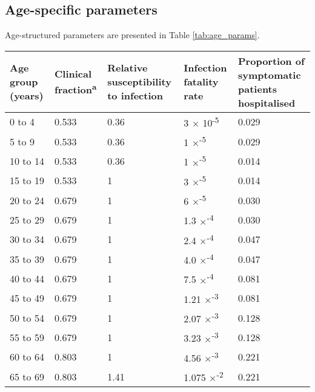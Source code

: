 \subsection{Age-specific parameters}

Age-structured parameters are presented in Table \ref{tab:age_params}.

\begin{table}[ht]
\renewcommand{\baselinestretch}{1}
    \begin{tabular}[ht]{| p{2cm} | p{2.5cm} | p{3cm} | p{3cm} | p{2.5cm}|}
    \hline
        Age group (years) & Clinical fraction\textsuperscript{a} & Relative susceptibility to infection & Infection fatality rate & Proportion of symptomatic patients hospitalised \\
        \hline
        0 to 4 & 0.533 & 0.36 & 3 $\times$ 10\textsuperscript{-5} & 0.029 \\
        \hline
        5 to 9 & 0.533 & 0.36 & 1 $\times$\textsuperscript{-5} & 0.029 \\
        \hline
        10 to 14 & 0.533 & 0.36 & 1 $\times$\textsuperscript{-5} & 0.014 \\
        \hline
        15 to 19 & 0.533 & 1 & 3 $\times$\textsuperscript{-5} & 0.014 \\
        \hline
        20 to 24 & 0.679 & 1 & 6 $\times$\textsuperscript{-5} & 0.030 \\
        \hline
        25 to 29 & 0.679 & 1 & 1.3 $\times$\textsuperscript{-4} & 0.030 \\
        \hline
        30 to 34 & 0.679 & 1 & 2.4 $\times$\textsuperscript{-4} & 0.047 \\
        \hline
        35 to 39 & 0.679 & 1 & 4.0 $\times$\textsuperscript{-4} & 0.047 \\
        \hline
        40 to 44 & 0.679 & 1 & 7.5 $\times$\textsuperscript{-4} & 0.081 \\
        \hline
        45 to 49 & 0.679 & 1 & 1.21 $\times$\textsuperscript{-3} & 0.081 \\
        \hline
        50 to 54 & 0.679 & 1 & 2.07 $\times$\textsuperscript{-3} & 0.128 \\
        \hline
        55 to 59 & 0.679 & 1 & 3.23 $\times$\textsuperscript{-3} & 0.128 \\
        \hline
        60 to 64 & 0.803 & 1 & 4.56 $\times$\textsuperscript{-3} & 0.221 \\
        \hline
        65 to 69 & 0.803 & 1.41 & 1.075 $\times$\textsuperscript{-2} & 0.221 \\

\end{tabular}
\end{table}
